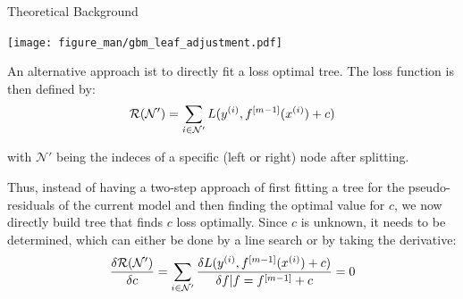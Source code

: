 \begin{vbframe}{Theoretical Background}
\begin{footnotesize}
\vspace{-0.5cm}

\begin{center}

\texttt{[image: figure\_man/gbm\_leaf\_adjustment.pdf]}

\end{center}

\end{footnotesize}

\framebreak

An alternative approach ist to directly fit a loss optimal tree.
The loss function is then defined by:
$$
\mathcal{R}(\mathcal{N}') = \sum_{i \in \mathcal{N}'} L(y^{(i)}, f^{[m-1]}(x^{(i)}) + c)
$$

with $\mathcal{N}'$ being the indeces of a specific (left or right) node after splitting.

Thus, instead of having a two-step approach of first fitting a tree for the pseudo-residuals of the current model and then finding the optimal value for $c$, we now directly build tree that finds $c$ loss optimally. Since $c$ is unknown, it needs to be determined, which can either be done by a line search or by taking the derivative:
$$
\frac{\delta{\mathcal{R}(\mathcal{N}')}}{\delta c} = \sum_{i \in \mathcal{N}'} \frac{\delta{L(y^{(i)}, f^{[m-1]}(x^{(i)}) + c)}}{\delta f | f = f^{[m-1]} + c} = 0
$$
\framebreak


\end{vbframe}



